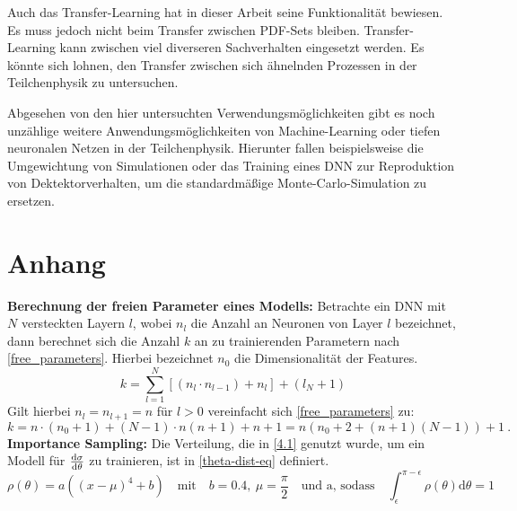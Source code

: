 Auch das Transfer-Learning hat in dieser Arbeit seine Funktionalität bewiesen. Es muss jedoch nicht beim Transfer zwischen PDF-Sets bleiben. Transfer-Learning kann zwischen viel diverseren Sachverhalten eingesetzt werden. Es könnte sich lohnen, den Transfer zwischen sich ähnelnden Prozessen in der Teilchenphysik zu untersuchen.

Abgesehen von den hier untersuchten Verwendungsmöglichkeiten gibt es noch unzählige weitere Anwendungsmöglichkeiten von Machine-Learning oder tiefen neuronalen Netzen in der Teilchenphysik. Hierunter fallen beispielsweise die Umgewichtung von Simulationen oder das Training eines DNN zur Reproduktion von Dektektorverhalten, um die standardmäßige Monte-Carlo-Simulation zu ersetzen.
\appendix
\chapter{Anhang}
\textbf{Berechnung der freien Parameter eines Modells:} \label{freie parameter} Betrachte ein DNN mit $N$ versteckten Layern $l$, wobei $n_l$ die Anzahl an Neuronen von Layer $l$ bezeichnet, dann berechnet sich die Anzahl $k$ an zu trainierenden Parametern nach \textsf{\autoref{free_parameters}}. Hierbei bezeichnet $n_0$ die Dimensionalität der Features.
\begin{equation}
	k = \sum_{l=1}^{N} \left[(n_l \cdot n_{l-1}) + n_l\right] + (l_N + 1)
	\label{free_parameters}
\end{equation}
Gilt hierbei $n_l = n_{l+1} = n$ für $l > 0$ vereinfacht sich \textsf{\autoref{free_parameters}} zu:
\begin{equation}
	k = n \cdot (n_0 + 1) + (N-1)\cdot n(n+1) + n + 1 = n \left(n_0 + 2 + (n + 1)(N-1)\right) + 1~.
\end{equation}
\textbf{Importance Sampling:} Die Verteilung, die in \textsf{\autoref{4.1}} genutzt wurde, um ein Modell für $\derivative{\sigma}{\theta}$ zu trainieren, ist in \textsf{\autoref{theta-dist-eq}} definiert.
\begin{equation}
	\label{theta-dist-eq}
	\rho(\theta) = a((x-\mu)^4 + b) \quad \text{mit} \quad b=0.4,~ \mu = \frac{\pi}{2} \quad \text{und a, sodass} \quad \int_{\epsilon}^{\pi - \epsilon} \rho(\theta) \text{d}\theta = 1
\end{equation}

